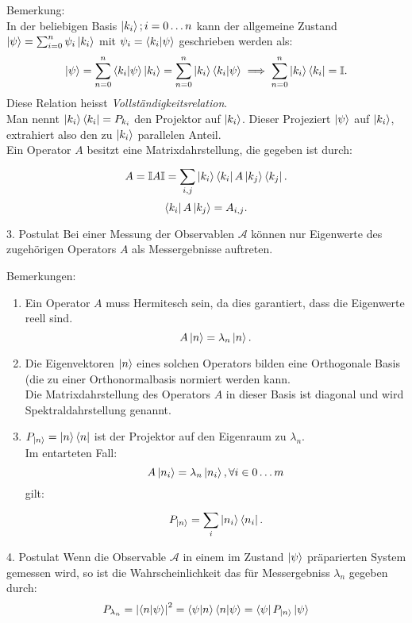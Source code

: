 \documentclass{report}
\begin{document}
Bemerkung:\\
In der beliebigen Basis ${\ket{k_i}; i = 0 \ldots n}$ kann der allgemeine Zustand $\ket{\psi}=\sum_{i=0}^{n} \psi_i \ket{k_i}$ mit $\psi_i = \braket{k_i}{\psi}$ geschrieben werden als: \[
	\ket{\psi} = \sum_{n=0}^{n} \braket{k_i}{\psi}\ket{k_i}
	= \sum_{n=0}^{n} \ket{k_i}\braket{k_i}{\psi}
	\implies \sum_{n=0}^{n} \ket{k_i}\bra{k_i} = \mathbb{I}
.\] 
Diese Relation heisst \emph{Vollständigkeitsrelation}.\\
Man nennt $\ket{k_i}\bra{k_i} = P_{k_i}$ den Projektor auf $\ket{k_i}$. Dieser Projeziert $\ket{\psi}$ auf $\ket{k_i}$, extrahiert also den zu $\ket{k_i}$ parallelen Anteil.
\\
Ein Operator $A$ besitzt eine Matrixdahrstellung, die gegeben ist durch: \[
A = \mathbb{I}A\mathbb{I}=\sum_{i,j}^{} \ket{k_i}\bra{k_i}A\ket{k_j}\bra{k_j} 
.\]
\[
	\bra{k_i}A\ket{k_j} = A_{i,j}
.\]
\begin{greenbox}{3. Postulat}
	Bei einer Messung der Observablen $\mathcal{A}$ können nur Eigenwerte des zugehörigen Operators $A$ als Messergebnisse auftreten.
\end{greenbox}

Bemerkungen:
\begin{enumerate}
	\item Ein Operator $A$ muss Hermitesch sein, da dies garantiert, dass die Eigenwerte reell sind. \[
			A\ket{n} = \lambda_n\ket{n}
	.\] 
	\item Die Eigenvektoren ${\ket{n}}$ eines solchen Operators bilden eine Orthogonale Basis (die zu einer Orthonormalbasis normiert werden kann.\\
		Die Matrixdahrstellung des Operators $A$ in dieser Basis ist diagonal und wird Spektraldahrstellung genannt.
	\item $P_{\ket{n}} = \ket{n}\bra{n}$ ist der Projektor auf den Eigenraum zu $\lambda_n$.\\
		Im entarteten Fall: \[
			A\ket{n_i} = \lambda_n\ket{n_i}, \forall i \in {0 \ldots m}
		\] 
		gilt: \[
			P_{\ket{n}} = \sum_{i}^{} \ket{n_i}\bra{n_i}
		.\] 
\end{enumerate}
\begin{greenbox}{4. Postulat}
	Wenn die Observable $\mathcal{A}$ in einem im Zustand $\ket{\psi}$ präparierten System gemessen wird, so ist die Wahrscheinlichkeit das für Messergebniss $\lambda_n$ gegeben durch: \[
		P_{\lambda_n} = \abs{\braket{n}{\psi}}^2 = \braket{\psi}{n}\braket{n}{\psi} = \bra{\psi}P_{\ket{n}}\ket{\psi}
	\] 
\end{greenbox}
\end{document}

